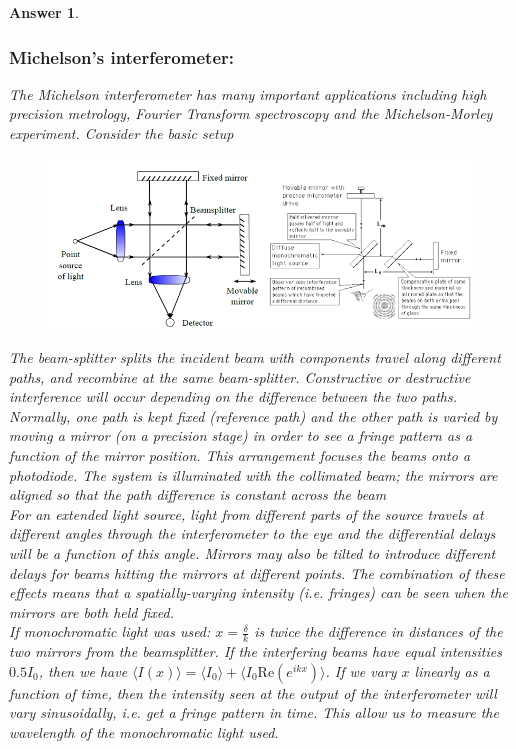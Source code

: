 \documentclass[a4paper]{article}
\newtheorem{ans}{Answer}[subsection]
\theoremstyle{new}
\begin{document}
\begin{ans}
\subsubsection*{Michelson's interferometer:}
The Michelson interferometer has many important applications including high precision metrology, Fourier Transform spectroscopy and the Michelson-Morley experiment. Consider the basic setup
\begin{figure}[H]
    \centering
    \includegraphics[width=\linewidth]{mmi.PNG}
\end{figure}
The beam-splitter splits the incident beam with components travel along different paths, and recombine at the same beam-splitter. Constructive or destructive interference will occur depending on the difference between the two paths. Normally, one path is kept fixed (reference path) and the other path is varied by moving a mirror (on a precision stage) in order to see a fringe pattern as a function of the mirror position. This arrangement focuses the beams onto a photodiode. The system is illuminated with the collimated beam; the mirrors are aligned so that the path difference is constant across the beam\\[5pt]
For an extended light source, light from different parts of the source travels at different angles through the interferometer to the eye and the differential delays will be a function of this angle. Mirrors may also be tilted to introduce different delays for beams hitting the mirrors at different points. The combination of these effects means that a spatially-varying intensity (i.e. fringes) can be seen when the mirrors are both held fixed.\\[5pt]
If monochromatic light was used: $x=\frac{\delta}{k}$ is twice the difference in distances of the two mirrors from the beamsplitter. If the interfering beams have equal intensities $0.5 I_0$, then we have $\langle I(x)\rangle=\langle I_0\rangle+\langle I_0\text{Re}(e^{ikx})\rangle$. If we vary $x$ linearly as a function of time, then the intensity seen at the output of the interferometer will vary sinusoidally, i.e. get a fringe pattern in time. This allow us to measure the wavelength of the monochromatic light used.\\[5pt]

\end{ans}
\end{document}
